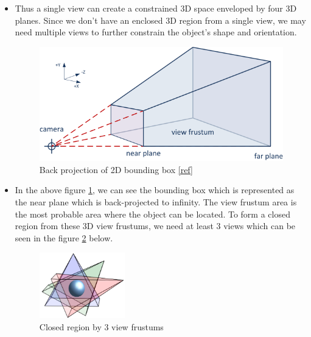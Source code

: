 \documentclass[report.tex]{subfiles}
\begin{document}
\begin{itemize}
\item Thus a single view can create a constrained 3D space enveloped by four 3D planes. Since we don't have an enclosed 3D region from a single view, we may need multiple views to further constrain the object's shape and orientation.

\begin{figure}[H]
\centering
\includegraphics[width=\textwidth, height=0.3\textheight] {Images/VisualCameraFrustum.png}
\caption{\centering Back projection of 2D bounding box \href{https://learnopengl.com/img/guest/2021/Frustum_culling/VisualCameraFrustum.png}{[ref]}}
\label{fig:frustum}
\end{figure}

\item In the above figure \ref{fig:frustum}, we can see the bounding box which is represented as the near plane which is back-projected to infinity. The view frustum area is the most probable area where the object can be located. To form a closed region from these 3D view frustums, we need at least 3 views which can be seen in the figure \ref{fig:enclosure} below.

\begin{figure}[H]
\centering
\includegraphics[width=0.35\textwidth, height=0.3\textheight] {Images/enclosure.png}
\caption{\centering Closed region by 3 view frustums}
\label{fig:enclosure}
\end{figure}


\end{itemize}
\end{document}
